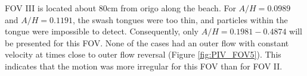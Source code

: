 \documentclass[review]{elsarticle}
\begin{document}
 FOV III is located about 80cm from origo along the beach. For $A/H=0.0989$ and $A/H=0.1191$, the swash tongues were too thin, and particles within the tongue were impossible to detect. Consequently, only $A/H=0.1981-0.4874$ will be presented for this FOV. None of the cases had an outer flow with constant velocity at times close to outer flow reversal (Figure \ref{fig:PIV_FOV5}). This indicates that the motion was more irregular for this FOV than for FOV II.
 \begin{figure}[]
\centering
{}
\end{figure}
\end{document}
